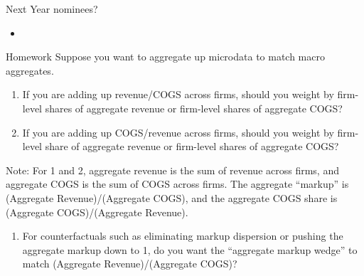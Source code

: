 \documentclass[usenames,dvipsnames,aspectratio=169]{beamer}
\begin{document}
\begin{frame}{Next Year nominees?} 
    \begin{itemize}[label=\textcolor{teal}{$\blacktriangleright$}]
        \item 
    \end{itemize}
\end{frame}

\begin{frame}[allowframebreaks]{Homework}
Suppose you want to aggregate up microdata to match macro aggregates. 
\begin{enumerate}[label=\textbf{\textcolor{teal}{(\arabic*)}},leftmargin=*]
    \item If you are adding up revenue/COGS across firms, should you weight by firm-level shares of aggregate revenue or firm-level shares of aggregate COGS? 
    \item If you are adding up COGS/revenue across firms, should you weight by firm-level share of aggregate revenue or firm-level shares of aggregate COGS? 
\end{enumerate}
Note: For 1 and 2, aggregate revenue is the sum of revenue across firms, and aggregate COGS is the sum of COGS across firms.  The aggregate ``markup'' is (Aggregate Revenue)/(Aggregate COGS), and the aggregate COGS share is (Aggregate COGS)/(Aggregate Revenue). 
\begin{enumerate}[resume*]
    \item For counterfactuals such as eliminating markup dispersion or pushing the aggregate markup down to 1, do you want the ``aggregate markup wedge'' to match (Aggregate Revenue)/(Aggregate COGS)? 
\end{enumerate}

\end{frame}
\end{document}
